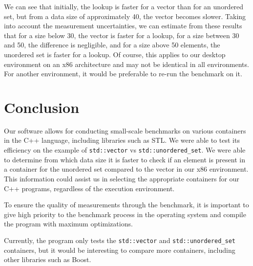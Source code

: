 \documentclass[conference]{IEEEtran} \IEEEoverridecommandlockouts
\def\code#1{\texttt{#1}}
\begin{document}
We can see that initially, the lookup is faster for a vector than 
for an unordered set, but from a data size of approximately 40, the 
vector becomes slower. Taking into account the measurement 
uncertainties, we can estimate from these results that for a size 
below 30, the vector is faster for a lookup, for a size between 30 
and 50, the difference is negligible, and for a size above 50 elements, 
the unordered set is faster for a lookup. Of course, this applies to 
our desktop environment on an x86 architecture and may not be identical 
in all environments. For another environment, it would be preferable 
to re-run the benchmark on it.

\section{Conclusion}

Our software allows for conducting small-scale benchmarks on various 
containers in the C++ language, including libraries such as STL. We 
were able to test its efficiency on the example of \code{std::vector} 
vs \code{std::unordered\_set}. We were able to determine from which data 
size it is faster to check if an element is present in a container for 
the unordered set compared to the vector in our x86 environment. This 
information could assist us in selecting the appropriate containers for 
our C++ programs, regardless of the execution environment.

To ensure the quality of measurements through the benchmark, it is 
important to give high priority to the benchmark process in the 
operating system and compile the program with maximum optimizations.

Currently, the program only tests the \code{std::vector} and 
\code{std::unordered\_set} containers, but it would be interesting to 
compare more containers, including other libraries such as Boost.

 
\end{document}
